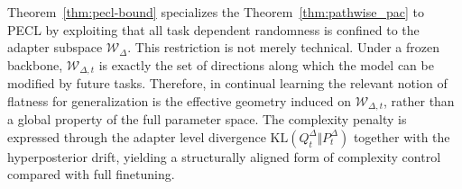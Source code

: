 \documentclass{article}
\theoremstyle{plain}
\theoremstyle{definition}
\theoremstyle{remark}
\begin{document}
Theorem~\ref{thm:pecl-bound} specializes the Theorem~\ref{thm:pathwise_pac} to PECL by exploiting that all task dependent randomness is confined to the adapter subspace $\mathcal W_\Delta$. This restriction is not merely technical.
Under a frozen backbone, $\mathcal W_{\Delta,t}$ is exactly the set of directions along which the model can be modified by future tasks.
Therefore, in continual learning the relevant notion of flatness for generalization is the effective geometry induced on $\mathcal W_{\Delta,t}$, rather than a global property of the full parameter space.
The complexity penalty is expressed through the adapter level divergence $\mathrm{KL}(Q_t^\Delta\Vert P_t^\Delta)$ together with the hyperposterior drift, yielding a structurally aligned form of complexity control compared with full finetuning.
\end{document}
